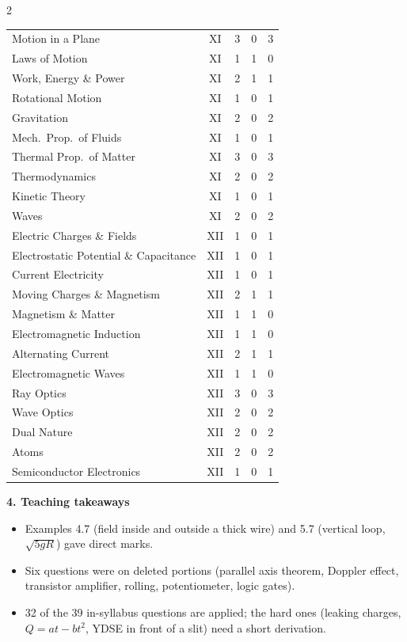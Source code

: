 \begin{multicols}{2}
{\begin{tabular}{@{}p{4.7cm}c@{\,}r@{\,}r@{\,}r@{}}
Motion in a Plane & XI & 3 & 0 & 3\\
Laws of Motion & XI & 1 & 1 & 0\\
Work, Energy \& Power & XI & 2 & 1 & 1\\
Rotational Motion & XI & 1 & 0 & 1\\
Gravitation & XI & 2 & 0 & 2\\
Mech.\ Prop.\ of Fluids & XI & 1 & 0 & 1\\
Thermal Prop.\ of Matter & XI & 3 & 0 & 3\\
Thermodynamics & XI & 2 & 0 & 2\\
Kinetic Theory & XI & 1 & 0 & 1\\
Waves & XI & 2 & 0 & 2\\
Electric Charges \& Fields & XII & 1 & 0 & 1\\
Electrostatic Potential \& Capacitance & XII & 1 & 0 & 1\\
Current Electricity & XII & 1 & 0 & 1\\
Moving Charges \& Magnetism & XII & 2 & 1 & 1\\
Magnetism \& Matter & XII & 1 & 1 & 0\\
Electromagnetic Induction & XII & 1 & 1 & 0\\
Alternating Current & XII & 2 & 1 & 1\\
Electromagnetic Waves & XII & 1 & 1 & 0\\
Ray Optics & XII & 3 & 0 & 3\\
Wave Optics & XII & 2 & 0 & 2\\
Dual Nature & XII & 2 & 0 & 2\\
Atoms & XII & 2 & 0 & 2\\
Semiconductor Electronics & XII & 1 & 0 & 1\\
\bottomrule\end{tabular}}\par\medskip
\textbf{\color{crimson}4. Teaching takeaways}\par\smallskip
{\footnotesize\begin{itemize}[leftmargin=1em,nosep]
\item Examples 4.7 (field inside and outside a thick wire) and 5.7 (vertical loop, $\sqrt{5gR}$) gave direct marks.
\item Six questions were on deleted portions (parallel axis theorem, Doppler effect, transistor amplifier, rolling, potentiometer, logic gates).
\item 32 of the 39 in-syllabus questions are applied; the hard ones (leaking charges, $Q=at-bt^2$, YDSE in front of a slit) need a short derivation.

\end{itemize}}
\end{multicols}

